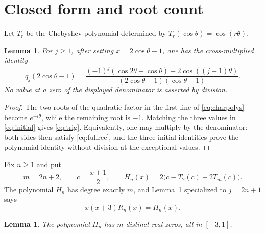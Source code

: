 \documentclass[11pt]{article}
\newtheorem{lemma}[theorem]{Lemma}
\begin{document}
\section{Closed form and root count}

Let $T_r$ be the Chebyshev polynomial determined by
$T_r(\cos\theta)=\cos(r\theta)$.

\begin{lemma}\label{lem:closed}
For $j\geq1$, after setting $x=2\cos\theta-1$, one has the
cross-multiplied identity
\begin{equation}\label{eq:trig}
 q_j(2\cos\theta-1)
 =\frac{(-1)^j(\cos2\theta-\cos\theta)
          +2\cos((j+1)\theta)}
        {(2\cos\theta-1)(\cos\theta+1)}.
\end{equation}
No value at a zero of the displayed denominator is asserted by division.
\end{lemma}

\begin{proof}
The two roots of the quadratic factor in the first line of
\eqref{eq:charpolys} become $e^{\pm i\theta}$, while the remaining root is
$-1$.  Matching the three values in \eqref{eq:initial} gives
\eqref{eq:trig}.  Equivalently, one may multiply by the denominator: both
sides then satisfy \eqref{eq:fullrec}, and the three initial identities prove
the polynomial identity without division at the exceptional values.
\end{proof}

Fix $n\geq1$ and put
\begin{equation}\label{eq:Hdef}
 m=2n+2,\qquad c=\frac{x+1}{2},\qquad
 H_n(x)=2\bigl(c-T_2(c)+2T_m(c)\bigr).
\end{equation}
The polynomial $H_n$ has degree exactly $m$, and Lemma~\ref{lem:closed}
specialized to $j=2n+1$ says
\begin{equation}\label{eq:factoridentity}
 x(x+3)R_n(x)=H_n(x).
\end{equation}

\begin{lemma}\label{lem:rootsH}
The polynomial $H_n$ has $m$ distinct real zeros, all in $[-3,1]$.
\end{lemma}
\end{document}
